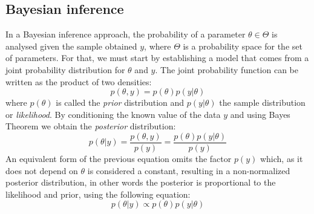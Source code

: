 \subsection{Bayesian inference}
In a Bayesian inference approach, the probability of a parameter $\theta \in \Theta$ is analysed given the sample obtained $y$, where $\Theta$ is a probability space for the set of parameters. For that, we must start by establishing a model that comes from a joint probability distribution for $\theta$ and $y$. The joint probability function can be written as the product of two densities:
%
\begin{equation*}
	p(\theta,y)=p(\theta)p(y|\theta)
\end{equation*}
%
where $p(\theta)$ is called the \textit{prior} distribution and $p(y|\theta)$ the sample distribution or \textit{likelihood}. By conditioning the known value of the data $y$ and using Bayes Theorem we obtain the \textit{posterior} distribution:
%
\begin{equation*}
	p(\theta|y)=\frac{p(\theta,y)}{p(y)}=\frac{p(\theta)p(y|\theta)}{p(y)}
\end{equation*}
%
An equivalent form of the previous equation omits the factor $p(y)$ which, as it does not depend on $\theta$ is considered a constant, resulting in a non-normalized posterior distribution, in other words the posterior is proportional to the likelihood and prior, using the following equation:
%
\begin{equation}\label{eq: bayes2}
	p(\theta|y)\propto p(\theta)p(y|\theta)
\end{equation}

